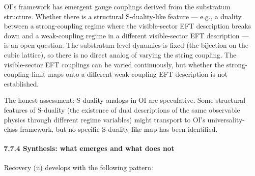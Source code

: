 \documentclass[
]{article}
\begin{document}
OI's framework has emergent gauge couplings derived from the substratum
structure. Whether there is a structural S-duality-like feature ---
e.g., a duality between a strong-coupling regime where the
visible-sector EFT description breaks down and a weak-coupling regime in
a different visible-sector EFT description --- is an open question. The
substratum-level dynamics is fixed (the bijection on the cubic lattice),
so there is no direct analog of varying the string coupling. The
visible-sector EFT couplings can be varied continuously, but whether the
strong-coupling limit maps onto a different weak-coupling EFT
description is not established.

The honest assessment: S-duality analogs in OI are speculative. Some
structural features of S-duality (the existence of dual descriptions of
the same observable physics through different regime variables) might
transport to OI's universality-class framework, but no specific
S-duality-like map has been identified.

\hypertarget{synthesis-what-emerges-and-what-does-not}{%
\paragraph{7.7.4 Synthesis: what emerges and what does
not}\label{synthesis-what-emerges-and-what-does-not}}

Recovery (ii) develops with the following pattern:
\end{document}
